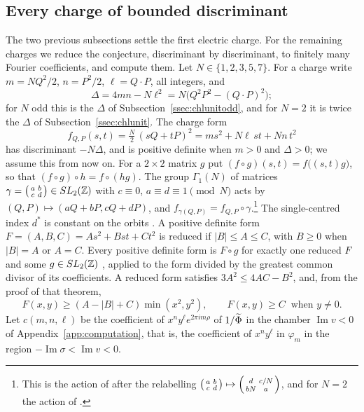 \subsection{Every charge of bounded discriminant}\label{ssec:chlbounded}

The two previous subsections settle the first electric charge. For the remaining charges we reduce the conjecture, discriminant by discriminant, to finitely many Fourier coefficients, and compute them. Let $N\in\{1,2,3,5,7\}$. For a charge write $m=NQ^2/2$, $n=P^2/2$, $\ell=Q\cdot P$, all integers, and
\[
\Delta=4mn-N\ell^2=N\big(Q^2P^2-(Q\cdot P)^2\big);
\]
for $N$ odd this is the $\Delta$ of Subsection~\ref{ssec:chlunitodd}, and for $N=2$ it is twice the $\Delta$ of Subsection~\ref{ssec:chlunit}. The charge form
\[
f_{Q,P}(s,t)=\tfrac N2\,(sQ+tP)^2=ms^2+N\ell\,st+Nn\,t^2
\]
has discriminant $-N\Delta$, and is positive definite when $m>0$ and $\Delta>0$; we assume this from now on. For a $2\times2$ matrix $g$ put $(f\circ g)(s,t)=f\big((s,t)g\big)$, so that $(f\circ g)\circ h=f\circ(hg)$. The group $\Gamma_1(N)$ of matrices $\gamma=\begin{psmallmatrix}a&b\\c&d\end{psmallmatrix}\in SL_2(\mathbb{Z})$ with $c\equiv0$, $a\equiv d\equiv1\pmod N$ acts by $(Q,P)\mapsto(aQ+bP,cQ+dP)$, and $f_{\gamma(Q,P)}=f_{Q,P}\circ\gamma$.\footnote{This is the action of \cite[(5.17)--(5.19)]{BSS25} after the relabelling $\begin{psmallmatrix}a&b\\c&d\end{psmallmatrix}\mapsto\begin{psmallmatrix}d&c/N\\bN&a\end{psmallmatrix}$, and for $N=2$ the action of \cite[(3.8)]{Sen11positivity}.} The single-centred index $d^*$ is constant on the orbits \cite[Section~5.3]{BSS25}. A positive definite form $F=(A,B,C)=As^2+Bst+Ct^2$ is reduced if $|B|\le A\le C$, with $B\ge0$ when $|B|=A$ or $A=C$. Every positive definite form is $F\circ g$ for exactly one reduced $F$ and some $g\in SL_2(\mathbb{Z})$ \cite[Theorem~2.8]{Cox13}, applied to the form divided by the greatest common divisor of its coefficients. A reduced form satisfies $3A^2\le4AC-B^2$, and, from the proof of that theorem,
\begin{equation}\label{eq:chlreduced}
F(x,y)\ge(A-|B|+C)\min(x^2,y^2),\qquad F(x,y)\ge C\ \text{ when } y\ne0 .
\end{equation}
Let $c(m,n,\ell)$ be the coefficient of $x^ny^\ell e^{2\pi im\rho}$ of $1/\widetilde{\Phi}$ in the chamber $\operatorname{Im}v<0$ of Appendix~\ref{app:computation}, that is, the coefficient of $x^ny^\ell$ in $\varphi_m$ in the region $-\operatorname{Im}\sigma<\operatorname{Im}v<0$.


